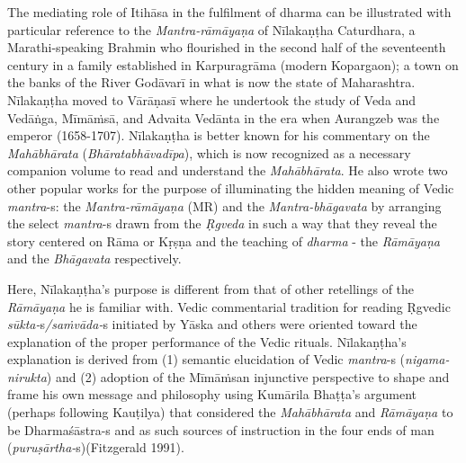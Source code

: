 The mediating role of Itihāsa in the fulfilment of dharma can be illustrated with particular reference to the \textit{Mantra-rāmāyaṇa} of Nīlakaṇṭha Caturdhara, a Marathi-speaking Brahmin who flourished in the second half of the seventeenth century in a family established in Karpuragrāma (modern Kopargaon); a town on the banks of the River Godāvarī in what is now the state of Maharashtra. Nīlakaṇṭha moved to Vārāṇasī where he undertook the study of Veda and Vedāṅga, Mīmāṁsā, and Advaita Vedānta in the era when Aurangzeb was the emperor (1658-1707). Nīlakaṇṭha is better known for his commentary on the \textit{Mahābhārata} (\textit{Bhāratabhāvadīpa}), which is now recognized as a necessary companion volume to read and understand the \textit{Mahābhārata}. He also wrote two other popular works for the purpose of illuminating the hidden meaning of Vedic \textit{mantra}-s: the \textit{Mantra-rāmāyaṇa} (MR) and the \textit{Mantra-bhāgavata} by arranging the select \textit{mantra}-s drawn from the \textit{Ṛgveda} in such a way that they reveal the story centered on Rāma or Kṛṣṇa and the teaching of \textit{dharma} - the \textit{Rāmāyaṇa} and the \textit{Bhāgavata} respectively.

\vskip 2pt

Here, Nīlakaṇṭha’s purpose is different from that of other retellings of the \textit{Rāmāyaṇa} he is familiar with. Vedic commentarial tradition for reading Ṛgvedic \textit{sūkta-}s\textit{/saṁvāda-}s initiated by Yāska and others were oriented toward the explanation of the proper performance of the Vedic rituals. Nīlakaṇṭha's explanation is derived from (1) semantic elucidation of Vedic \textit{mantra}-s (\textit{nigama-nirukta}) and (2) adoption of the Mīmāṁsan injunctive perspective to shape and frame his own message and philosophy using Kumārila Bhaṭṭa’s argument (perhaps following Kauṭilya) that considered the \textit{Mahābhārata} and \textit{Rāmāyaṇa} to be Dharmaśāstra-s and as such sources of instruction in the four ends of man (\textit{puruṣārtha-}s)(Fitzgerald 1991).

